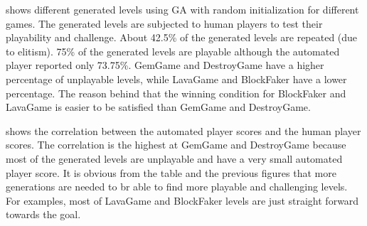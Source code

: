  shows different generated levels using GA with random initialization for different games. The generated levels are subjected to human players to test their playability and challenge. About 42.5\% of the generated levels are repeated (due to elitism). 75\% of the generated levels are playable although the automated player reported only 73.75\%. GemGame and DestroyGame have a higher percentage of unplayable levels, while LavaGame and BlockFaker have a lower percentage. The reason behind that the winning condition for BlockFaker and LavaGame is easier to be satisfied than GemGame and DestroyGame.\\\par 

 shows the correlation between the automated player scores and the human player scores. The correlation is the highest at GemGame and DestroyGame because most of the generated levels are unplayable and have a very small automated player score. It is obvious from the table and the previous figures that more generations are needed to br able to find more playable and challenging levels. For examples, most of LavaGame and BlockFaker levels are just straight forward towards the goal.

